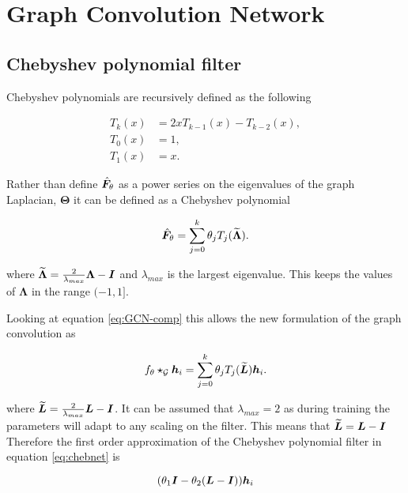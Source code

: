 \chapter{Graph Convolution Network}

\section{Chebyshev polynomial filter}
\label{app:chebyshev}

Chebyshev polynomials are recursively defined as the following

\begin{equation}
    \begin{aligned}
        T_k(x) &= 2xT_{k-1}(x) - T_{k-2}(x), \\
        T_0(x) &= 1, \\
        T_1(x) &= x.
    \end{aligned}
\end{equation}

Rather than define $\hat{{\bm{F}}}_\theta$ as a power series on the eigenvalues of the graph Laplacian, $\bm{\Theta}$ it can be defined as a Chebyshev polynomial

\begin{equation}
    \hat{{\bm{F}}}_\theta = \sum_{j=0}^k\theta_jT_j(\widetilde{\bm{\Lambda}}).
\end{equation}

where $\widetilde{\bm{\Lambda}} = \frac2{\lambda_{max}}\bm{\Lambda} - {\bm{I}}$ and $\lambda_{max}$ is the largest eigenvalue. This keeps the values of $\bm{\Lambda}$ in the range $(-1, 1]$.

Looking at equation \ref{eq:GCN-comp} this allows the new formulation of the graph convolution as 

\begin{equation}
    \label{eq:chebnet}
    f_\theta \star_{\mathcal{G}} {\bm{h}}_i = \sum_{j=0}^k \theta_jT_j(\widetilde{{\bm{L}}}){\bm{h}}_i.
\end{equation}

where $\widetilde{{\bm{L}}} = \frac2{\lambda_{max}}{\bm{L}} - {\bm{I}}$. It can be assumed that $\lambda_{max} = 2$ as during training the parameters will adapt to any scaling on the filter. This means that $\widetilde{{\bm{L}}} = {\bm{L}} - {\bm{I}}$ Therefore the first order approximation of the Chebyshev polynomial filter in equation \ref{eq:chebnet} is 

\begin{equation}
    (\theta_1{\bm{I}} - \theta_2({\bm{L}} - {\bm{I}})){\bm{h}}_i
\end{equation}

%

